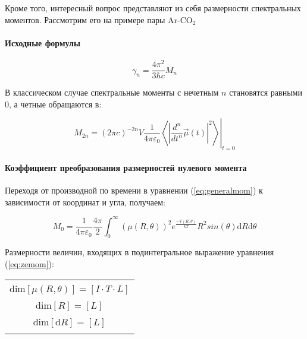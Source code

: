 Кроме того, интересный вопрос представляют из себя размерности спектральных моментов. Рассмотрим его на примере пары $\text{Ar-CO}_2$
\paragraph{Исходные формулы}

\begin{equation}
\label{eq:gammaM}
\gamma_n=\frac{4\pi^2}{3\hbar c}M_n
\end{equation}

В классическом случае спектральные моменты с нечетным $n$ становятся равными $0$, а четные обращаются в:

\begin{equation}
\label{eq:generalmom}
M_{2n}=(2\pi c)^{-2n}V\frac{1}{4\pi\varepsilon_0}\left.\left\langle \left| \frac{d^n}{dt^n} \vec{\mu}(t) \right|^2 \right\rangle\right|_{t=0}
\end{equation}

\paragraph{Коэффициент преобразования размерностей нулевого момента} 


Переходя от производной по времени в уравнении (\ref{eq:generalmom}) к зависимости от координат и угла, получаем:

\begin{equation}
\label{eq:zemom}
M_0=\frac{1}{4\pi\varepsilon_0}\frac{4\pi}{2}\int^{\infty}_0(\mu(R,\theta))^2e^{\frac{-V(R,\theta)}{kT}}R^2sin(\theta)\mathrm{d}R\mathrm{d} \theta
\end{equation}

Размерности величин, входящих в подинтегральное выражение уравнения (\ref{eq:zemom}):\newline

\begin{center}
\begin{tabular}{|c|}
\hline
\\
\( \text{dim}[\mu(R,\theta)]=[I \cdot T \cdot L]\)\\
\\
\( \text{dim}[R]=[ L]\)\\
\\
\( \text{dim}[\mathrm{d}R]=[L]\)\\
\\
\hline
\end{tabular}
\end{center}

